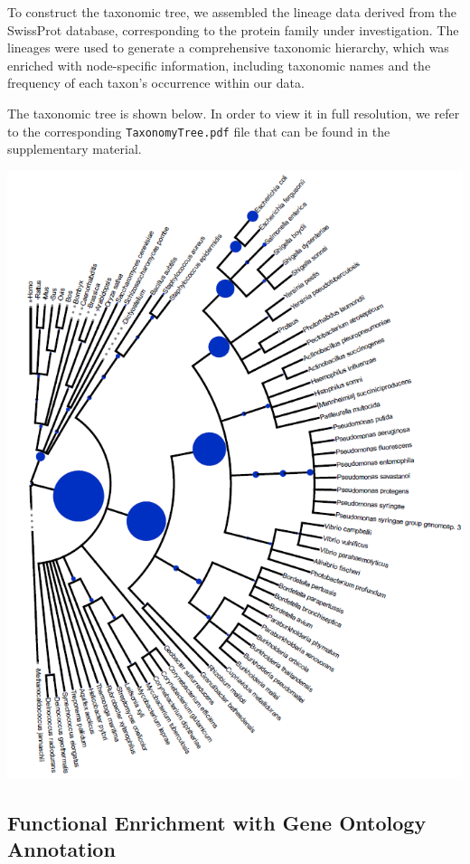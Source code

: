 \documentclass[10pt,twocolumn,letterpaper]{article}
\begin{document}
To construct the taxonomic tree, we assembled the lineage data derived from the SwissProt database, corresponding to the protein family under investigation. The lineages were used to generate a comprehensive taxonomic hierarchy, which was enriched with node-specific information, including taxonomic names and the frequency of each taxon's occurrence within our data.

The taxonomic tree is shown below. In order to view it in full resolution, we refer to the corresponding \texttt{TaxonomyTree.pdf} file that can be found in the supplementary material.

\begin{center}
    \includegraphics[scale=0.4]{report/img/taxonomy_tree.png}
\end{center}

\subsection{Functional Enrichment with Gene Ontology Annotation}
\end{document}

